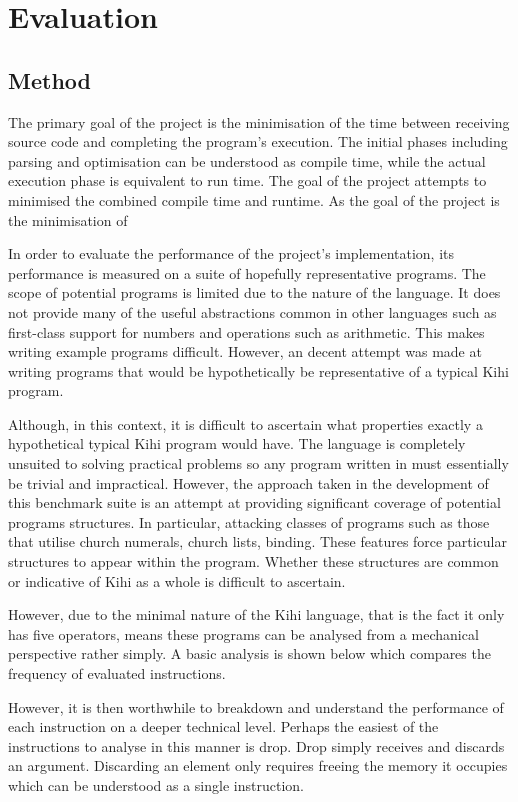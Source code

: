 \chapter{Evaluation} \label{C:evaluation}

\section{Method}
The primary goal of the project is the minimisation of the time between receiving source code and completing the program's execution. The initial phases including parsing and optimisation can be understood as compile time, while the actual execution phase is equivalent to run time. The goal of the project attempts
to minimised the combined compile time and runtime. 
As the goal of the project is the minimisation of 


In order to evaluate the performance of the project's implementation, its performance is measured on a suite of hopefully representative programs. The scope of potential programs is limited due to the nature of the language. It does not provide many of the useful abstractions common in other languages such as first-class support for numbers and operations such as arithmetic. This makes writing example programs difficult. However, an decent attempt was made at writing programs that would be hypothetically be representative of a typical Kihi program.

Although, in this context, it is difficult to ascertain what properties exactly a hypothetical typical Kihi program would have. The language is completely unsuited to solving practical problems so any program written in must essentially be trivial and impractical. However, the approach taken in the development of this benchmark suite is an attempt at providing significant coverage of potential programs structures. In particular, attacking classes of programs such as those that utilise church numerals, church lists, binding. These features force particular structures to appear within the program. Whether these structures are common or indicative of Kihi as a whole is difficult to ascertain.

However, due to the minimal nature of the Kihi language, that is the fact it only has five operators, means these programs can be analysed from a mechanical perspective rather simply. A basic analysis is shown below which compares the frequency of evaluated instructions.

However, it is then worthwhile to breakdown and understand the performance of each instruction on a deeper technical level. Perhaps the easiest of the instructions to analyse in this manner is drop. Drop simply receives and discards an argument. Discarding an element only requires freeing the memory it occupies which can be understood as a single instruction. 


